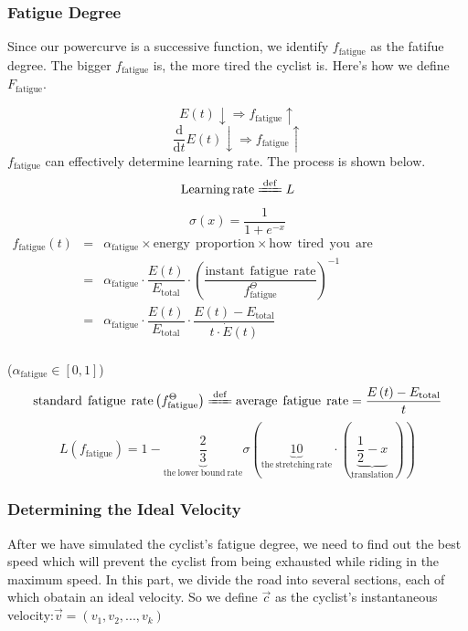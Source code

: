 \documentclass[12pt]{article}
\theoremstyle{definition}
\theoremstyle{remark}
\numberwithin{equation}{section}
\begin{document}
	\subsubsection{Fatigue Degree}
	Since our powercurve is a successive function, we identify $f_{\mathrm{fatigue}}$ as the fatifue degree. The bigger $f_{\mathrm{fatigue}}$ is, the more tired the cyclist is. Here's how we define $F_\mathrm{fatigue}$.

	$$E(t)\downarrow\Rightarrow f_{\mathrm{fatigue}}\uparrow$$
    $$\dfrac{\mathrm{d}}{\mathrm{d}t}E(t)\downarrow\Rightarrow f_{\mathrm{fatigue}}\uparrow$$
	$f_\mathrm{fatigue}$ can effectively determine learning rate.
	 The process is shown below.
  	$$\mathrm{Learning\,rate}\xlongequal{\mathrm{def}}L$$
    $$\sigma \left( x \right) =\dfrac{1}{1+e^{-x}}$$
    $\begin{array}{ccc}
		f_\mathrm{fatigue}\left(t\right)&=&\alpha_{\mathrm{fatigue}}\times \mathrm{energy}\:\:\mathrm{proportion}\times \mathrm{how}\:\:\mathrm{tired}\:\:\mathrm{you}\:\:\mathrm{are}\\  
     	\ &=&\alpha_\mathrm{fatigue}\cdot \dfrac{E(t)}{E_\mathrm{total}}\cdot \left( \dfrac{\mathrm{instant}\:\:\mathrm{fatigue}\:\:\mathrm{rate}}{f_\mathrm{fatigue}^{\Theta}}\right)^{-1}\\
    	\ &=&\alpha_{\mathrm{fatigue}}\cdot \dfrac{E\left( t \right)}{E_{\mathrm{total}}}\cdot \dfrac{E\left( t \right) -E_{\mathrm{total}}}{t\cdot \dot{E}\left( t \right)}\\
	\end{array}$

     ($\alpha _{\mathrm{fatigue}}\in \left[ 0,1 \right] $)
     $$\mathrm{standard}\:\:\mathrm{fatigue}\:\:\mathrm{rate}\left( f_{\mathrm{fatigue}}^{\Theta} \right) \xlongequal{\mathrm{def}}\mathrm{average}\:\:\mathrm{fatigue}\:\:\mathrm{rate}=\dfrac{E\left( t \right) -E_{\mathrm{total}}}{t}
      $$
    $$L\left( f_{\mathrm{fatigue}} \right) =1-\underset{\mathrm{the}\:\mathrm{lower}\:\mathrm{bound}\:\mathrm{rate}}{\underbrace{\dfrac{2}{3}}}\sigma \left( \underset{\mathrm{the}\:\mathrm{stretching}\:\mathrm{rate}}{\underbrace{10}}\cdot \left( \underset{\mathrm{translation}}{\underbrace{\dfrac{1}{2}-x}} \right) \right) $$
     \subsubsection{Determining the Ideal Velocity}
	 After we have simulated the cyclist's fatigue degree, we need to find out the best speed which will prevent the cyclist from being exhausted while riding in the maximum speed. In this part, we divide the road into several sections, each of which obatain an ideal velocity. So we define $\vec{c}$ as the cyclist's instantaneous velocity:$\vec{v}=\left( v_1,v_2,...,v_k \right)$ 
	
\end{document}
